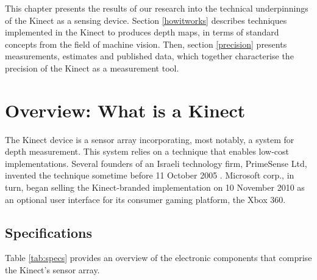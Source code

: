 This chapter presents the results of our research into the technical
underpinnings of the Kinect as a sensing device. Section \ref{howitworks}
describes techniques implemented in the Kinect to produces depth maps, in terms
of standard concepts from the field of machine vision. Then, section
\ref{precision} presents measurements, estimates and published data, which
together characterise the precision of the Kinect as a measurement tool.

\section{Overview: What is a Kinect}

The Kinect device is a sensor array incorporating, most notably, a system for
depth measurement. This system relies on a technique that enables low-cost
implementations. Several founders of an Israeli technology firm, PrimeSense Ltd,
invented the technique sometime before 11 October 2005 \cite{ZALEVSKY:2007}.
Microsoft corp., in turn, began selling the Kinect-branded implementation on 10
November 2010 as an optional user interface for its consumer gaming platform,
the Xbox 360.


\subsection{Specifications}

Table \ref{tab:specs} provides an overview of the electronic components that
comprise the Kinect's sensor array.

